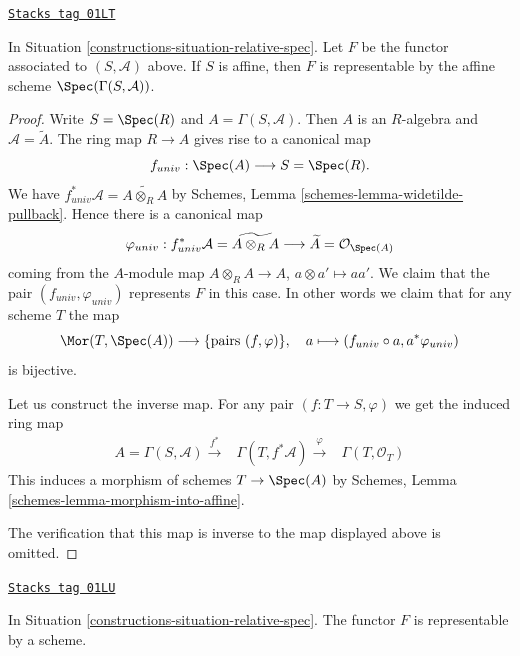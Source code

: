 \begin{lemma}
\label{constructions-lemma-spec-affine}
\href{https://stacks.math.columbia.edu/tag/01LT}{\texttt{Stacks tag 01LT}}

In Situation \ref{constructions-situation-relative-spec}.
Let $F$ be the functor associated to $(S, \mathcal{A})$ above.
If $S$ is affine, then $F$ is representable by the
affine scheme $\Spec(\Gamma(S, \mathcal{A}))$.
\end{lemma}

\begin{proof}
Write $S = \Spec(R)$ and $A = \Gamma(S, \mathcal{A})$.
Then $A$ is an $R$-algebra and $\mathcal{A} = \widetilde A$.
The ring map $R \to A$ gives rise to a canonical map
$$
f_{univ} : \Spec(A)
\longrightarrow
S = \Spec(R).
$$
We have
$f_{univ}^*\mathcal{A} =  \widetilde{A \otimes_R A}$
by Schemes, Lemma \ref{schemes-lemma-widetilde-pullback}.
Hence there is a canonical map
$$
\varphi_{univ} :
f_{univ}^*\mathcal{A} = \widetilde{A \otimes_R A}
\longrightarrow
\widetilde A = \mathcal{O}_{\Spec(A)}
$$
coming from the $A$-module map $A \otimes_R A \to A$,
$a \otimes a' \mapsto aa'$. We claim that the pair
$(f_{univ}, \varphi_{univ})$ represents $F$ in this case.
In other words we claim that for any scheme $T$ the map
$$
\Mor(T, \Spec(A)) \longrightarrow \{\text{pairs } (f, \varphi)\},\quad
a \longmapsto (f_{univ} \circ a, a^*\varphi_{univ})
$$
is bijective.

\medskip\noindent
Let us construct the inverse map.
For any pair $(f : T \to S, \varphi)$ we get the induced
ring map
$$
\begin{array}{ccc}A = \Gamma(S, \mathcal{A}) \overset{f^*}{\longrightarrow} & \Gamma(T, f^*\mathcal{A}) \overset{\varphi}{\longrightarrow} & \Gamma(T, \mathcal{O}_T)\end{array}
$$
This induces a morphism of schemes $T \to \Spec(A)$
by Schemes, Lemma \ref{schemes-lemma-morphism-into-affine}.

\medskip\noindent
The verification that this map is inverse to the map
displayed above is omitted.
\end{proof}

\begin{lemma}[Spec]
\label{constructions-lemma-spec}
\href{https://stacks.math.columbia.edu/tag/01LU}{\texttt{Stacks tag 01LU}}

In Situation \ref{constructions-situation-relative-spec}.
The functor $F$ is representable by a scheme.
\end{lemma}


